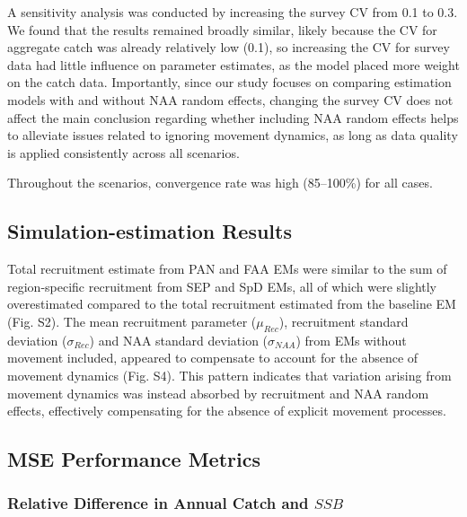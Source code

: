 \documentclass[
  12pt,
]{article}
\begin{document}
A sensitivity analysis was conducted by increasing the survey CV from
0.1 to 0.3. We found that the results remained broadly similar, likely
because the CV for aggregate catch was already relatively low (0.1), so
increasing the CV for survey data had little influence on parameter
estimates, as the model placed more weight on the catch data.
Importantly, since our study focuses on comparing estimation models with
and without NAA random effects, changing the survey CV does not affect
the main conclusion regarding whether including NAA random effects helps
to alleviate issues related to ignoring movement dynamics, as long as
data quality is applied consistently across all scenarios.

Throughout the scenarios, convergence rate was high (85--100\%) for all
cases.

\hypertarget{simulation-estimation-results-1}{%
\subsection{Simulation-estimation
Results}\label{simulation-estimation-results-1}}

Total recruitment estimate from PAN and FAA EMs were similar to the sum
of region-specific recruitment from SEP and SpD EMs, all of which were
slightly overestimated compared to the total recruitment estimated from
the baseline EM (Fig. S2). The mean recruitment parameter
(\(\mu_{Rec}\)), recruitment standard deviation (\(\sigma_{Rec}\)) and
NAA standard deviation (\(\sigma_{NAA}\)) from EMs without movement
included, appeared to compensate to account for the absence of movement
dynamics (Fig. S4). This pattern indicates that variation arising from
movement dynamics was instead absorbed by recruitment and NAA random
effects, effectively compensating for the absence of explicit movement
processes.

\hypertarget{mse-performance-metrics-1}{%
\subsection{MSE Performance Metrics}\label{mse-performance-metrics-1}}

\hypertarget{relative-difference-in-annual-catch-and-ssb}{%
\subsubsection{\texorpdfstring{Relative Difference in Annual Catch and
\(SSB\)}{Relative Difference in Annual Catch and SSB}}\label{relative-difference-in-annual-catch-and-ssb}}
\end{document}
